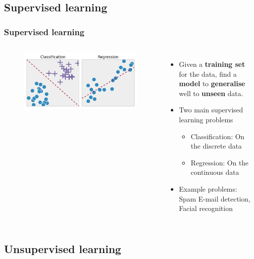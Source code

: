 \documentclass[aspectratio=169]{beamer}
\begin{document}
\subsection{Supervised learning}

\begin{frame}
	\frametitle{Supervised learning}
	\begin{columns}
		\begin{figure}
			\includegraphics[width=1.0\textwidth]{imgs/supervised_learning.png}
		\end{figure}
		\begin{itemize}
			\item<2-> Given a \textbf{training set} for the data, find a \textbf{model} to \textbf{generalise} well to \textbf{unseen} data.
			\item<3-> Two main supervised learning problems
			      \begin{itemize}
				      \item<4-> Classification: On the discrete data
				      \item<5-> Regression: On the continuous data
			      \end{itemize}
			\item<6-> Example problems: Spam E-mail detection, Facial recognition
		\end{itemize}
	\end{columns}
\end{frame}

\subsection{Unsupervised learning}
\end{document}
